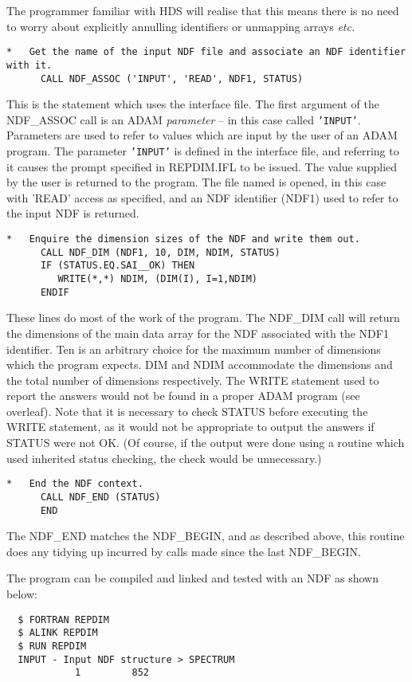 The programmer familiar with HDS will realise that this means 
there is no need to worry about explicitly 
annulling identifiers or unmapping arrays {\it etc.}
\begin{verbatim}
*   Get the name of the input NDF file and associate an NDF identifier with it.
      CALL NDF_ASSOC ('INPUT', 'READ', NDF1, STATUS)
\end{verbatim}
This is the statement which uses the interface file.
The first argument of the NDF\_ASSOC call is an ADAM {\sl parameter} --
in this case called {\tt 'INPUT'}.
Parameters are used to refer to values which are input by the user of an 
ADAM program.
The parameter {\tt'INPUT'} is defined in the interface file, and referring to it
causes the prompt specified in REPDIM.IFL to be issued.
The value
supplied by the user is returned to the program.
The file named is opened, in this case with 'READ' access
as specified, and an NDF identifier (NDF1) used to refer to the input NDF
is returned.
\begin{verbatim}
*   Enquire the dimension sizes of the NDF and write them out.
      CALL NDF_DIM (NDF1, 10, DIM, NDIM, STATUS)
      IF (STATUS.EQ.SAI__OK) THEN
         WRITE(*,*) NDIM, (DIM(I), I=1,NDIM)
      ENDIF
\end{verbatim}
These lines do most of the work of the program.
The NDF\_DIM call will return the dimensions of the main data array
for the NDF associated with the NDF1 identifier.
Ten is an arbitrary choice  for the maximum number of dimensions 
which the program expects.
DIM and NDIM accommodate the dimensions and the total number of dimensions 
respectively.
The WRITE statement used to report the answers would not be found in 
a proper ADAM program (see overleaf).
Note that it is necessary to check STATUS before executing the WRITE 
statement, as it would not be appropriate to output the answers
if STATUS were not OK.
(Of course, if the output were done  using a routine which used
inherited status checking, the check would be unnecessary.)
\begin{verbatim}
*   End the NDF context.                                       
      CALL NDF_END (STATUS)                                  
      END                 
\end{verbatim}
The NDF\_END matches the NDF\_BEGIN,
and as described above, this routine does any tidying up incurred by 
calls made since the last NDF\_BEGIN.

The program can be compiled and linked  and tested with 
an NDF as shown below:
\begin{verbatim}
  $ FORTRAN REPDIM
  $ ALINK REPDIM
  $ RUN REPDIM
  INPUT - Input NDF structure > SPECTRUM
            1         852
\end{verbatim}

